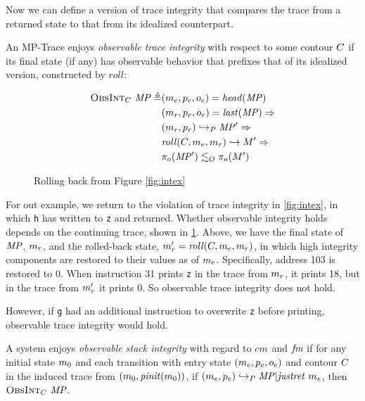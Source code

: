 \documentclass[acmsmall,review,anonymous]{acmart}\settopmatter{printfolios=true,printccs=false,printacmref=false}
\begin{document}
      Now we can define a version of trace integrity that compares the trace
      from a returned state to that from its idealized counterpart.


      An MP-Trace enjoys {\em observable trace integrity} with respect to
      some contour \(C\) if its final state (if any) has observable
      behavior that prefixes that of its idealized version, constructed by
      \(\mathit{roll}\):

      \[\begin{split}
        \text{\sc ObsInt}_C ~ \mathit{MP} \triangleq
        & (m_e,p_e,o_e) = \mathit{head}(\mathit{MP}) \\
        & (m_r,p_r,o_r) = \mathit{last}(\mathit{MP}) \Rightarrow \\
        & (m_r,p_r) \hookrightarrow_P \mathit{MP}' \Rightarrow \\
        & \mathit{roll}(C,m_e,m_r) \hookrightarrow M'
          \Rightarrow \\
        & \pi_o(\mathit{MP}') \lesssim_O \pi_o(M')
      \end{split}\]

    \begin{figure}
      \integritylazyexample
      \caption{Rolling back from Figure \ref{fig:intex}}
      \label{fig:intlex}
    \end{figure}

    For out example, we return to the violation of trace integrity in
    \cref{fig:intex}, in which {\tt h} has written to {\tt z} and returned.
    Whether observable integrity holds depends on the continuing trace, shown
    in \cref{fig:intlex}. Above, we have the final state of \(\mathit{MP}\),
    \(m_r\), and the rolled-back state, \(m_r' =
    \mathit{roll}(C,m_e,m_r)\), in which high integrity
    components are restored to their values as of \(m_e\). Specifically,
    address 103 is restored to 0. When instruction 31 prints {\tt z} in the
    trace from \(m_r\), it prints 18, but in the trace from \(m_r'\)
    it prints 0. So observable trace integrity does not hold.

    However, if {\tt g} had an additional instruction to overwrite {\tt z}
    before printing, observable trace integrity would hold.


      A system enjoys {\em observable stack integrity} with regard to
      \(cm\) and \(\mathit{fm}\) if for any initial state \(m_0\) and
      each transition with entry state \((m_e,p_e,o_e)\)
      and contour \(C\) in the induced trace from
      \((m_0,\mathit{pinit}(m_0))\), if
      \((m_e,p_e) \hookrightarrow_P \mathit{MP} | \mathit{justret}\ m_e\),
      then \(\text{\sc ObsInt}_C ~ \mathit{MP}\).
\end{document}

